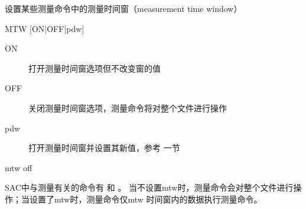 \label{cmd:mtw}

设置某些测量命令中的测量时间窗（measurement time window）

\begin{SACSTX}
MTW [ON|OFF|pdw]
\end{SACSTX}

\begin{description}
\item [ON] 打开测量时间窗选项但不改变窗的值
\item [OFF] 关闭测量时间窗选项，测量命令将对整个文件进行操作
\item [pdw] 打开测量时间窗并设置其新值，参考  一节
\end{description}

\begin{SACDFT}
mtw off
\end{SACDFT}

SAC中与测量有关的命令有  和 。
当不设置mtw时，测量命令会对整个文件进行操作；当设置了mtw时，测量命令仅mtw
时间窗内的数据执行测量命令。
